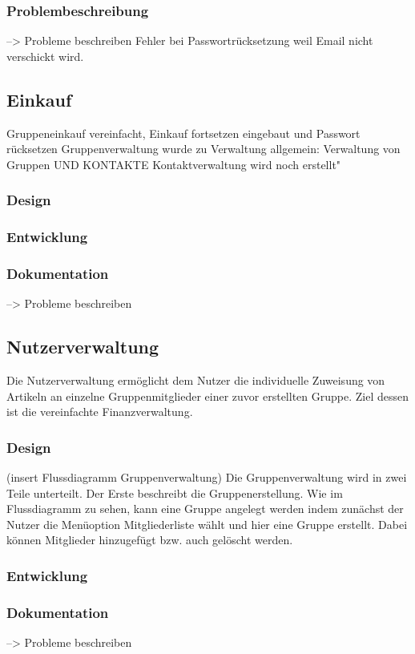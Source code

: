 \documentclass[12pt,a4paper]{article}
\begin{document}
\subsubsection*{Problembeschreibung} --> Probleme beschreiben
Fehler bei Passwortrücksetzung weil Email nicht verschickt wird.
\newpage


\subsection{Einkauf}
Gruppeneinkauf vereinfacht, Einkauf fortsetzen eingebaut und Passwort rücksetzen
Gruppenverwaltung wurde zu Verwaltung allgemein:  Verwaltung von Gruppen UND KONTAKTE 
Kontaktverwaltung wird noch erstellt"
\subsubsection*{Design}
\subsubsection*{Entwicklung}
\subsubsection*{Dokumentation} --> Probleme beschreiben
\newpage

\subsection{Nutzerverwaltung}
Die Nutzerverwaltung ermöglicht dem Nutzer die individuelle Zuweisung von Artikeln an einzelne Gruppenmitglieder einer zuvor erstellten Gruppe. Ziel dessen ist die vereinfachte Finanzverwaltung.

\subsubsection*{Design}
(insert Flussdiagramm Gruppenverwaltung)
Die Gruppenverwaltung wird in zwei Teile unterteilt. Der Erste beschreibt die Gruppenerstellung. Wie im Flussdiagramm zu sehen, kann eine Gruppe angelegt werden indem zunächst der Nutzer die Menüoption Mitgliederliste wählt und hier eine Gruppe erstellt. Dabei können Mitglieder hinzugefügt bzw. auch gelöscht werden.
\subsubsection*{Entwicklung}

\subsubsection*{Dokumentation} --> Probleme beschreiben
\newpage
\end{document}
